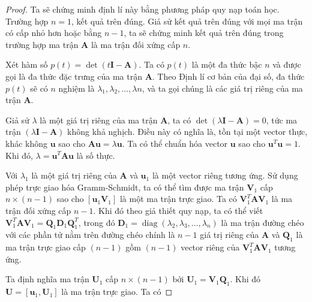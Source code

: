 \documentclass[14pt,oneside,a4paper]{report}
\numberwithin{equation}{section}
\begin{document}
\begin{proof}
	Ta sẽ chứng minh định lí này bằng phương pháp quy nạp toán học. Trường hợp $n=1$, kết quả trên đúng. Giả sử kết quả trên đúng với mọi ma trận có cấp nhỏ hơn hoặc bằng $n-1$, ta sẽ chứng minh kết quả trên đúng trong trường hợp ma trận $\mathbf{A}$ là ma trận đối xứng cấp $n$.
	
	Xét hàm số $p(t)=\operatorname{det}(t \mathbf{I}-\mathbf{A})$. Ta có $p(t)$ là một đa thức bậc $n$ và được gọi là đa thức đặc trưng của ma trận $\mathbf{A}$. Theo Định lí cơ bản của đại số, đa thức $p(t)$ sẽ có $n$ nghiệm là $\lambda_{1}, \lambda_{2}, \ldots, \lambda n$, và ta gọi chúng là các giá trị riêng của ma trận $\mathbf{A}$.
	
	Giả sử $\lambda$ là một giá trị riêng của ma trận $\mathbf{A}$, ta có $\operatorname{det}(\lambda \mathbf{I}-\mathbf{A})=0$, tức ma trận $(\lambda \mathbf{I}-\mathbf{A})$ không khả nghịch. Điều này có nghĩa là, tồn tại một vector thực, khác không $\mathbf{u}$ sao cho $\mathbf{A} \mathbf{u}=\lambda \mathbf{u}$. Ta có thể chuẩn hóa vector $\mathbf{u}$ sao cho $\mathbf{u}^{T} \mathbf{u}=1$. Khi đó, $\lambda=\mathbf{u}^{T} \mathbf{A u}$ là số thực.
	
	Với $\lambda_{1}$ là một giá trị riêng của $\mathbf{A}$ và $\mathbf{u}_{1}$ là một vector riêng tương ứng. Sử dụng phép trực giao hóa Gramm-Schmidt, ta có thể tìm được ma trận $\mathbf{V}_{1}$ cấp $n \times(n-1)$ sao cho $\left[\mathbf{u}_{1} \mathbf{V}_{1}\right]$ là một ma trận trực giao. Ta có $\mathbf{V}_{1}^{T} \mathbf{A} \mathbf{V}_{1}$ là ma trận đối xứng cấp $n-1$. Khi đó theo giả thiết quy nạp, ta có thể viết $\mathbf{V}_{1}^{T} \mathbf{A} \mathbf{V}_{1}=\mathbf{Q}_{1} \mathbf{D}_{1} \mathbf{Q}_{1}^{T}$, trong đó $\mathbf{D}_{1}=\operatorname{diag}\left(\lambda_{2}, \lambda_{3}, \ldots, \lambda_{n}\right)$ là ma trận đường chéo với các phần tử nằm trên đường chéo chính là $n-1$ giá trị riêng của $\mathbf{A}$ và $\mathbf{Q}_{1}$ là ma trận trực giao cấp $(n-1)$ gồm $(n-1)$ vector riêng của $\mathbf{V}_{1}^{T} \mathbf{A} \mathbf{V}_{1}$ tương ứng.
	
	Ta định nghĩa ma trận $\mathbf{U}_{1}$ cấp $n \times(n-1)$ bởi $\mathbf{U}_{1}=\mathbf{V}_{1} \mathbf{Q}_{1}$. Khi đó $\mathbf{U}=\left[\mathbf{u}_{1}, \mathbf{U}_{1}\right]$ là ma trận trực giao. Ta có
	

\end{proof}
\end{document}
